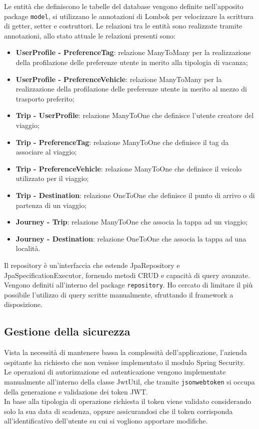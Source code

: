 \noindent
Le entità che definiscono le tabelle del database vengono definite nell'apposito package \texttt{model}, si utilizzano le annotazioni di Lombok per velocizzare la scrittura di getter, setter e costruttori. 
Le relazioni tra le entità sono realizzate tramite annotazioni, allo stato attuale le relazioni presenti sono:
\begin{itemize}
    \item \textbf{UserProfile - PreferenceTag}: relazione ManyToMany per la realizzazione della profilazione delle preferenze utente in merito alla tipologia di vacanza;
    \item \textbf{UserProfile - PreferenceVehicle}: relazione ManyToMany per la realizzazione della profilazione delle preferenze utente in merito al mezzo di trasporto preferito;
    \item \textbf{Trip - UserProfile}: relazione ManyToOne che definisce l'utente creatore del viaggio; 
    \item \textbf{Trip - PreferenceTag}: relazione ManyToOne che definisce il tag da associare al viaggio;
    \item \textbf{Trip - PreferenceVehicle}: relazione ManyToOne che definisce il veicolo utilizzato per il viaggio;
    \item \textbf{Trip - Destination}: relazione OneToOne che definisce il punto di arrivo o di partenza di un viaggio;
    \item \textbf{Journey - Trip}: relazione ManyToOne che associa la tappa ad un viaggio;
    \item \textbf{Journey - Destination}: relazione OneToOne che associa la tappa ad una località.
\end{itemize}

\noindent
Il repository è un'interfaccia che estende JpaRepository e JpaSpecificationExecutor, fornendo metodi CRUD e capacità di query avanzate.
Vengono definiti all'interno del package \texttt{repository}.
Ho cercato di limitare il più possibile l'utilizzo di query scritte manualmente, sfruttando il framework a disposizione.


\subsection{Gestione della sicurezza}
Vista la necessità di mantenere bassa la complessità dell'applicazione, l'azienda ospitante ha richiesto che non venisse implementato il modulo Spring Security.\\
Le operazioni di autorizzazione ed autenticazione vengono implementate manualmente all'interno della classe JwtUtil, che tramite \texttt{jsonwebtoken} si occupa della generazione e validazione dei token JWT.\\
In base alla tipologia di operazione richiesta il token viene validato considerando solo la sua data di scadenza, oppure assicurandosi che il token corrisponda all'identificativo dell'utente su cui si vogliono apportare modifiche.
